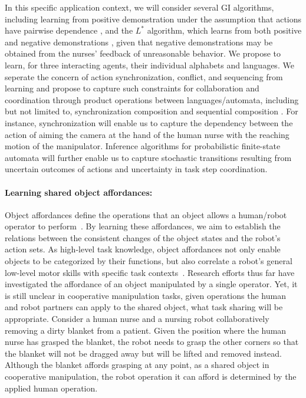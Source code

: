 \documentclass[letterpaper, 11 pt, onecolumn]{article}
\begin{document}
In this specific application context, we will consider several GI algorithms, including learning from positive demonstration under the assumption that actions have pairwise dependence \cite{heinz2013learning}, and the $L^\ast$ algorithm, which learns from both positive and negative demonstrations \cite{angluin1987learning}, given that negative demonstrations may be obtained from the nurses’ feedback of unreasonable behavior. We propose to learn, for three interacting agents, their individual alphabets and languages. We seperate the concern of  action synchronization, conflict, and sequencing from learning and propose to capture such constraints for collaboration and coordination through product operations between languages/automata, including but not limited to, synchronization composition and sequential composition \cite{alur2015principles,hopcroft2001introduction}. 
For instance, synchronization will enable us to capture the dependency between the action of aiming the camera at the hand of the human nurse with the reaching motion of the manipulator.  Inference algorithms for probabilistic finite-state automata \cite{clark2004pac} \cite[Chap 12]{de2010grammatical} will further enable us to capture stochastic transitions resulting from uncertain outcomes of actions and uncertainty in task step coordination. 

\paragraph*{Learning shared object affordances:}
Object affordances define the operations that an object allows a human/robot operator to perform~\cite{gibson2014ecological}. By learning these affordances, we aim to establish the relations between the consistent changes of the object states and the robot’s action sets. As high-level task knowledge, object affordances not only enable objects to be categorized by their functions, but also correlate a robot's general low-level motor skills with specific task contexts~\cite{fitzpatrick2003learning, veloso2005learning, thomaz2009learning,lopes2007affordance,montesano2008learning, lopes2010abstraction, kjellstrom2011visual,aksoy2011learning}. Research efforts thus far have investigated the affordance of an object manipulated by a single operator. Yet, it is still unclear in cooperative manipulation tasks, given operations the human and robot partners can apply to the shared object, what task sharing will be appropriate. Consider a human nurse and a nursing robot collaboratively removing a dirty blanket from a patient.  Given the position where the human nurse has grasped the blanket, the robot needs to grasp the other corners so that the blanket will not be dragged away but will be lifted and removed instead. Although the blanket affords grasping at any point, as a shared object in cooperative manipulation, the robot operation it can afford is determined by the applied human operation. 
\end{document}

